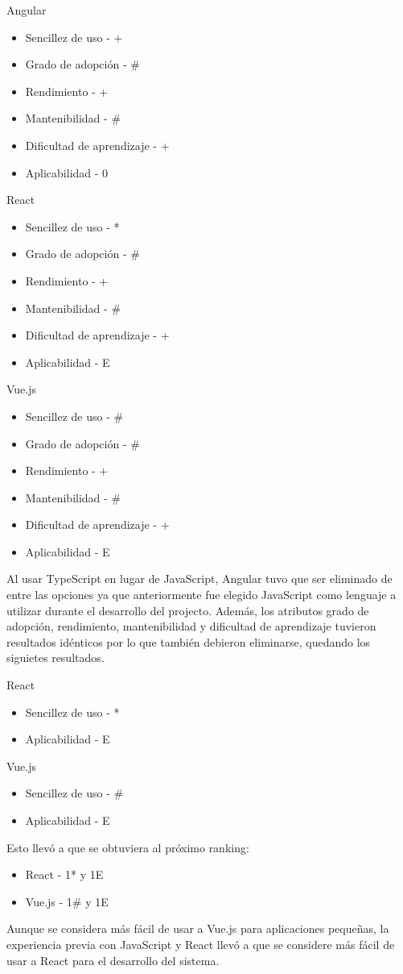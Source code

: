 \documentclass{article}
\begin{document}
Angular
\begin{itemize}
    \item Sencillez de uso - +
    \item Grado de adopción - \#
    \item Rendimiento - +
    \item Mantenibilidad - \#
    \item Dificultad de aprendizaje - +
    \item Aplicabilidad - 0
\end{itemize}
React
\begin{itemize}
    \item Sencillez de uso - *
    \item Grado de adopción - \#
    \item Rendimiento - +
    \item Mantenibilidad - \#
    \item Dificultad de aprendizaje - +
    \item Aplicabilidad - E
\end{itemize}
Vue.js
\begin{itemize}
    \item Sencillez de uso - \#
    \item Grado de adopción - \#
    \item Rendimiento - +
    \item Mantenibilidad - \#
    \item Dificultad de aprendizaje - +
    \item Aplicabilidad - E
\end{itemize}
Al usar TypeScript en lugar de JavaScript, Angular tuvo que ser eliminado de entre las opciones ya que anteriormente fue elegido JavaScript como lenguaje a utilizar durante el desarrollo del projecto. Además, los atributos grado de adopción, rendimiento, mantenibilidad y dificultad de aprendizaje tuvieron resultados idénticos por lo que también debieron eliminarse, quedando los siguietes resultados.

React
\begin{itemize}
    \item Sencillez de uso - *
    \item Aplicabilidad - E
\end{itemize}
Vue.js
\begin{itemize}
    \item Sencillez de uso - \#
    \item Aplicabilidad - E
\end{itemize}
Esto llevó a que se obtuviera al próximo ranking:
\begin{itemize}
    \item React - 1* y 1E
    \item Vue.js - 1\# y 1E
\end{itemize}
Aunque se considera más fácil de usar a Vue.js para aplicaciones pequeñas, la experiencia previa con JavaScript y React llevó a que se considere más fácil de usar a React para el desarrollo del sistema.
\end{document}
